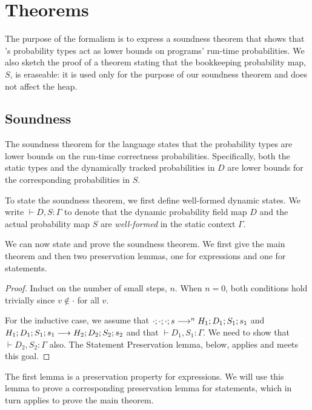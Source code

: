 {\section{Theorems}

The purpose of the formalism is to express a soundness theorem that shows that
\lang's probability types act as lower bounds on programs' run-time
probabilities.
We also sketch the proof of a theorem stating that the bookkeeping probability map, $S$,
is eraseable: it is used only for the purpose of our soundness theorem and
does not affect the heap.

\subsection{Soundness}

The soundness theorem for the language states that the probability types are
lower bounds on the run-time correctness probabilities.
Specifically, both the static types  and the dynamically tracked
probabilities in $D$ are lower bounds for the corresponding probabilities in
$S$.

To state the soundness theorem, we first define well-formed dynamic states.
We write
$\vdash D, S : \Gamma$
to denote that the dynamic probability field map $D$
and the actual probability map $S$
are \emph{well-formed} in the static context $\Gamma$.



We can now state and prove the soundness theorem. We first give the main
theorem and then two
preservation lemmas, one for expressions and one for statements.



\begin{proof}
Induct on the number of small steps, $n$.
When $n = 0$, both conditions hold trivially since $v \notin \cdot$ for all
$v$.

For the inductive case, we assume that
$\cdot ; \cdot ; \cdot ; s \longrightarrow^n
H_1 ; D_1; S_1; s_1$
and
$H_1 ; D_1 ; S_1 ; s_1 \longrightarrow
H_2 ; D_2 ; S_2 ; s_2$
and that
$\vdash D_1, S_1 : \Gamma$.
We need to show that
$\vdash D_2, S_2 : \Gamma$ also.
The Statement Preservation lemma, below, applies and meets this goal.
\end{proof}

The first lemma is a preservation property for expressions. We will use this
lemma to prove a corresponding preservation lemma for statements, which in turn applies to
prove the main theorem.

}
